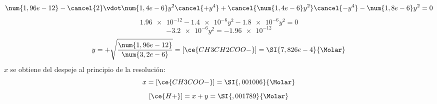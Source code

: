 \begin{frame}
\begin{overprint}
$$			$$
		\onslide<9>
			$$
				\num{1,96e-12} -\cancel{2}\vdot\num{1,4e-6}y^2 \cancel{+y^4} + \cancel{\num{1,4e-6}y^2} \cancel{-y^4} -\num{1,8e-6}y^2 = 0
			$$
		\onslide<10>
			$$
				\num{1,96e-12} -\num{1,4e-6}y^2 -\num{1,8e-6}y^2 = 0
			$$
		\onslide<11>
			$$
				-\num{3,2e-6}y^2 = -\num{1,96e-12}
			$$
		\onslide<12->
			$$
				y = +\sqrt{\frac{\num{1,96e-12}}{\num{3,2e-6}}} = [\ce{CH3CH2COO-}] = \SI{7,826e-4}{\Molar}
			$$
			$x$ se obtiene del despeje al principio de la resolución:
			$$
				x = [\ce{CH3COO-}] = \SI{,001006}{\Molar}
			$$
			$$
				[\ce{H+}] = x + y = \SI{,001789}{\Molar}
			$$
	\end{overprint}
\end{frame}
